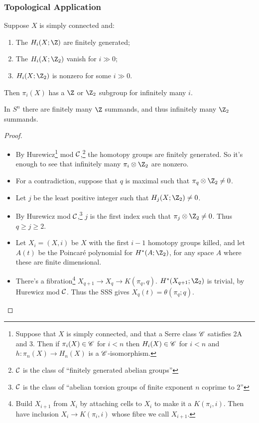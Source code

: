 \documentclass[11pt]{article}
\begin{document}
\begin{SerreCohModTwoEilMacLane}
\subsubsection*{Topological Application}
\begin{thm*}
Suppose $X$ is simply connected and:
\begin{enumerate}\squishlist
\item The $H_i(X;\Z)$ are finitely generated;
\item The $H_i(X;\Z_2)$ vanish for $i\gg0$;
\item $H_i(X;\Z_2)$ is nonzero for some $i\gg0$.
\end{enumerate}
Then $\pi_i(X)$ has a $\Z$ or $\Z_2$ subgroup for infinitely many $i$.
\end{thm*}
\begin{exmp*}
In $S^n$ there are finitely many $\Z$ summands, and thus infinitely many $\Z_2$ summands.
\end{exmp*}
\begin{proof}
\begin{itemize}\squishlist
\item By Hurewicz\footnote{Suppose that $X$ is simply connected, and that a Serre class $\mathscr{C}$ satisfies \textup{2A} and \textup{3}. Then if $\pi_i(X)\in\mathscr{C}$ for $i<n$ then $H_i(X)\in\mathscr{C}$ for $i<n$ and $h:\pi_n(X)\to H_n(X)$ is a $\mathscr{C}$-isomorphism.} mod $\mathcal{C}$,\footnote{$\mathcal{C}$ is the class of ``finitely generated abelian groups''} the homotopy groups are finitely generated. So it's enough to see that infinitely many $\pi_i\otimes\Z_2$ are nonzero.
\item For a contradiction, suppose that $q$ is maximal such that $\pi_q\otimes \Z_2\neq0$.
\item Let $j$ be the least positive integer such that $H_j(X;\Z_2)\neq0$.
\item By Hurewicz mod $\mathcal{C}$,\footnote{$\mathcal{C}$ is the class of ``abelian torsion groups of finite exponent $n$ coprime to $2$''} $j$ is the first index such that $\pi_j\otimes \Z_2\neq0$. Thus $q\geq j\geq2$.
\item Let $X_i=(X,i)$ be $X$ with the first $i-1$ homotopy groups killed, and let $A(t)$ be the Poincar\'e polynomial for $H^*(A;\Z_2)$, for any space $A$ where these are finite dimensional.
\item There's a fibration\footnote{Build $X_{i+1}$ from $X_{i}$ by attaching cells to $X_{i}$ to make it a $K(\pi_i,i)$. Then have inclusion $X_{i}\to K(\pi_i,i)$ whose fibre we call $X_{i+1}$.} $X_{q+1}\to X_q\to K(\pi_q,q)$. $H^*(X_{q+1};\Z_2)$ is trivial, by Hurewicz mod $\mathcal{C}$. Thus the SSS gives $X_{q}(t)=\theta(\pi_q;q)$.

\end{itemize}
\end{proof}
\end{SerreCohModTwoEilMacLane}
\end{document}
